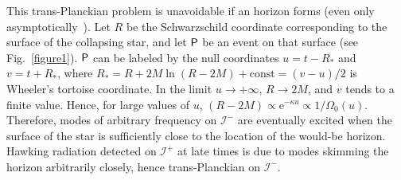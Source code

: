 \documentclass[prd,groupedaddress, showpacs, showkeys, onecolumn, nofootinbib, 12pt]{revtex4-2}
\newcommand{\scri}{\mathscr{I}}
\begin{document}
This trans-Planckian problem is unavoidable if an horizon forms (even only asymptotically~\cite{Barcelo:2006np, Barcelo:2006uw}).  Let $R$ be the Schwarzschild coordinate corresponding to the surface of the collapsing star, and let $\sf P$ be an event on that surface (see Fig.~\ref{figure1}).  $\sf P$ can be labeled by the null coordinates $u=t-R_\ast$ and $v=t+R_\ast$, where $R_\ast=R+2M\ln\left(R-2M\right)+\mbox{const}=\left(v-u\right)/2$ is Wheeler's tortoise coordinate.  In the limit $u\to +\infty$, $R\to 2M$, and $v$ tends to a finite value.  Hence, for large values of $u$, $(R-2M)\propto \mathrm{e}^{-\kappa u}\propto 1/\Omega_0(u)$. Therefore, modes of arbitrary frequency on $\scri^-$ are eventually excited when the surface of the star is sufficiently close to the location of the would-be horizon.  Hawking radiation detected on $\scri^+$ at late times is due to modes skimming the horizon arbitrarily closely, hence trans-Planckian on $\scri^-$.
\end{document}
